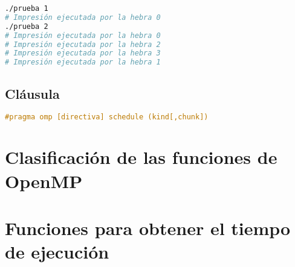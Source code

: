 \begin{lstlisting}[language=sh]
./prueba 1
# Impresión ejecutada por la hebra 0
./prueba 2
# Impresión ejecutada por la hebra 0
# Impresión ejecutada por la hebra 2
# Impresión ejecutada por la hebra 3
# Impresión ejecutada por la hebra 1
\end{lstlisting}

\subsection{Cláusula }

\begin{lstlisting}[language=C]
#pragma omp [directiva] schedule (kind[,chunk])
\end{lstlisting}

\section{Clasificación de las funciones de OpenMP}

\section{Funciones para obtener el tiempo de ejecución}
